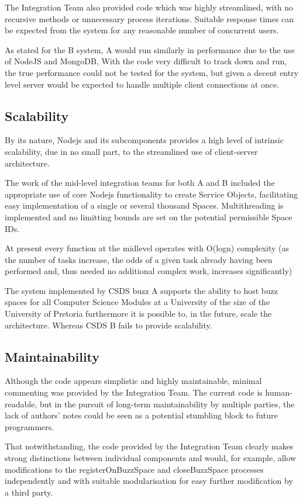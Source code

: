 \documentclass[12pt]{article}
\begin{document}
The Integration Team also provided code which was highly streamlined, with no recursive methods or unnecessary process iterations. Suitable response times can be expected from the system for any reasonable number of concurrent users.


As stated for the B system, A would run similarly in performance due to the use of NodeJS and MongoDB, With the code very difficult to track down and run, the true performance could not be tested for the system, but given a decent entry level server would be expected to handle multiple client connections at once.
\subsection{Scalability}
By its nature, Nodejs and its subcomponents provides a high level of intrinsic scalability, due in no small part, to the streamlined use of client-server architecture. 

The work of the mid-level integration teams for both A and B included the appropriate use of core Nodejs functionality to create Service Objects, facilitating easy implementation of a single or several thousand Spaces. Multithreading is implemented and no limitting bounds are set on the potential permissible Space IDs.

At present every function at the midlevel operates with O(logn) complexity (as the number of tasks increase, the odds of a given task already having been performed and, thus needed no additional complex work, increases significantly) 

The system implemented by CSDS buzz A supports the ability to host buzz spaces for all Computer Science Modules at a University of the size of the University of Pretoria furthermore it is possible to, in the future, scale the architecture. Whereas CSDS B fails to provide scalability.

\subsection{Maintainability}
Although the code appears simplistic and highly maintainable, minimal commenting was provided by the Integration Team. The current code is human-readable, but in the pursuit of long-term maintainability by multiple parties, the lack of authors’ notes could be seen as a potential stumbling block to future programmers.

That notwithstanding, the code provided by the Integration Team clearly makes strong distinctions between individual components and would, for example, allow modifications to the registerOnBuzzSpace and closeBuzzSpace processes independently and with suitable modularisation for easy further modification by a third party.
\end{document}
